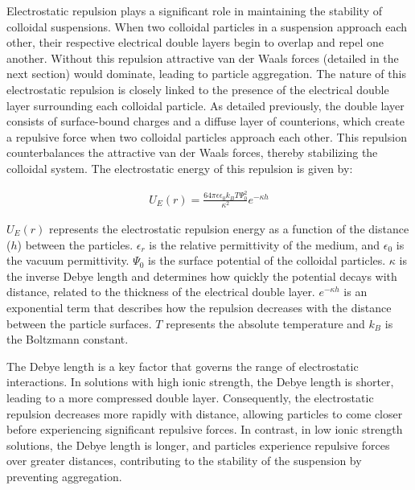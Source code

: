 Electrostatic repulsion plays a significant role in maintaining the stability of colloidal suspensions. When two colloidal particles in a suspension approach each other, their respective electrical double layers begin to overlap and repel one another. Without this repulsion attractive van der Waals forces (detailed in the next section) would dominate, leading to particle aggregation. The nature of this electrostatic repulsion is closely linked to the presence of the electrical double layer surrounding each colloidal particle. As detailed previously, the double layer consists of surface-bound charges and a diffuse layer of counterions, which create a repulsive force when two colloidal particles approach each other. This repulsion counterbalances the attractive van der Waals forces, thereby stabilizing the colloidal system.\cite{hunter1989foundations} The electrostatic energy of this repulsion is given by:


\begin{equation} %
\begin{split}
U_E(r)= \frac{64 \pi \epsilon \epsilon_0 k_BT \Psi_0^2}{\kappa^2} e^{-\kappa h}
\end{split}
\end{equation}

\( U_E(r) \) represents the electrostatic repulsion energy as a function of the distance (\( h \)) between the particles. \( \epsilon_r \) is the relative permittivity of the medium, and \( \epsilon_0 \) is the vacuum permittivity. \( \Psi_0 \) is the surface potential of the colloidal particles. \( \kappa \) is the inverse Debye length and determines how quickly the potential decays with distance, related to the thickness of the electrical double layer. \( e^{-\kappa h} \) is an exponential term that describes how the repulsion decreases with the distance between the particle surfaces. $T$ represents the absolute temperature and $k_B$ is the Boltzmann constant. \cite{OHSHIMA200218} \cite{behrens2001charge}

The Debye length is a key factor that governs the range of electrostatic interactions. In solutions with high ionic strength, the Debye length is shorter, leading to a more compressed double layer. Consequently, the electrostatic repulsion decreases more rapidly with distance, allowing particles to come closer before experiencing significant repulsive forces. In contrast, in low ionic strength solutions, the Debye length is longer, and particles experience repulsive forces over greater distances, contributing to the stability of the suspension by preventing aggregation.

